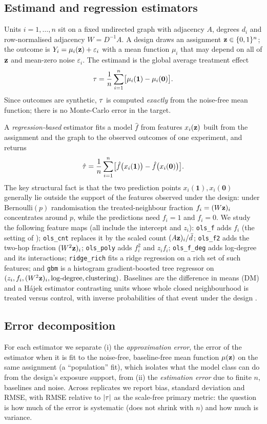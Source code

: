 \subsection{Estimand and regression estimators}
Units $i=1,\dots,n$ sit on a fixed undirected graph with adjacency $A$, degrees $d_i$ and row-normalised adjacency $W=D^{-1}A$. A design draws an assignment $\mathbf{z}\in\{0,1\}^n$; the outcome is $Y_i=\mu_i(\mathbf{z})+\varepsilon_i$ with a mean function $\mu_i$ that may depend on all of $\mathbf{z}$ and mean-zero noise $\varepsilon_i$. The estimand is the global average treatment effect
\[
\tau=\frac1n\sum_{i=1}^n\bigl[\mu_i(\mathbf 1)-\mu_i(\mathbf 0)\bigr].
\]
Since outcomes are synthetic, $\tau$ is computed \emph{exactly} from the noise-free mean function; there is no Monte-Carlo error in the target.

A \emph{regression-based} estimator fits a model $\hat f$ from features $x_i(\mathbf{z})$ built from the assignment and the graph to the observed outcomes of one experiment, and returns
\[
\hat{\tau}=\frac1n\sum_{i=1}^n\bigl[\hat f\bigl(x_i(\mathbf 1)\bigr)-\hat f\bigl(x_i(\mathbf 0)\bigr)\bigr].
\]
The key structural fact is that the two prediction points $x_i(\mathbf 1),x_i(\mathbf 0)$ generally lie outside the support of the features observed under the design: under Bernoulli$(p)$ randomisation the treated-neighbour fraction $f_i=(W\mathbf{z})_i$ concentrates around $p$, while the predictions need $f_i=1$ and $f_i=0$. We study the following feature maps (all include the intercept and $z_i$): \texttt{ols\_f} adds $f_i$ (the setting of \citealt{chin2019regression}); \texttt{ols\_cnt} replaces it by the scaled count $(A\mathbf{z})_i/\bar d$; \texttt{ols\_f2} adds the two-hop fraction $(W^2\mathbf{z})_i$; \texttt{ols\_poly} adds $f_i^2$ and $z_if_i$; \texttt{ols\_f\_deg} adds log-degree and its interactions; \texttt{ridge\_rich} fits a ridge regression on a rich set of such features; and \texttt{gbm} is a histogram gradient-boosted tree regressor on $(z_i,f_i,(W^2\mathbf{z})_i,\text{log-degree},\text{clustering})$. Baselines are the difference in means (DM) and a H\'ajek estimator contrasting units whose whole closed neighbourhood is treated versus control, with inverse probabilities of that event under the design \citep{aronow2017estimating,ugander2013graph}.

\subsection{Error decomposition}
For each estimator we separate (i) the \emph{approximation error}, the error of the estimator when it is fit to the noise-free, baseline-free mean function $\mu(\mathbf{z})$ on the same assignment (a ``population'' fit), which isolates what the model class can do from the design's exposure support, from (ii) the \emph{estimation error} due to finite $n$, baselines and noise. Across replicates we report bias, standard deviation and RMSE, with RMSE relative to $|\tau|$ as the scale-free primary metric: the question is how much of the error is systematic (does not shrink with $n$) and how much is variance.

